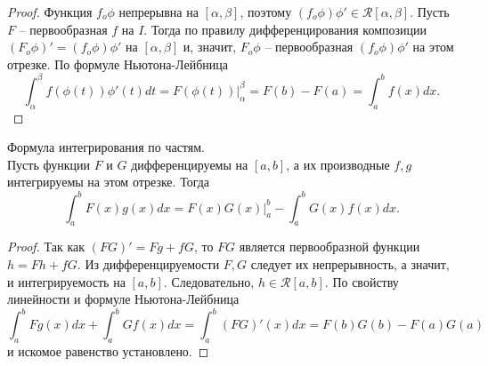     \begin{proof}
        Функция $f_{o}\phi$ непрерывна на $[\alpha, \beta]$, поэтому $(f_{o}\phi)\phi' \in \mathcal{R}[\alpha, \beta]$. Пусть $F$ -- первообразная $f$ на $I$. Тогда по правилу дифференцирования композиции $(F_{o}\phi)' = (f_{o}\phi)\phi'$ на $[\alpha, \beta]$ и, значит, $F_{o}\phi$ -- первообразная $(f_{o}\phi)\phi'$ на этом отрезке. По формуле Ньютона-Лейбница
        \[\int_{\alpha}^{\beta}f(\phi(t))\phi'(t)dt = F(\phi(t))|_{\alpha}^{\beta} = F(b) - F(a) = \int_{a}^{b}f(x)dx.\]
    \end{proof}
    
    \begin{theorem}{Формула интегрирования по частям.}\\
        Пусть функции $F$ и $G$ дифференцируемы на $[a, b]$, а их производные $f, g$ интегрируемы на этом отрезке. Тогда
        \[\int_{a}^{b}F(x)g(x)dx = F(x)G(x)|_{a}^{b} - \int_{a}^{b}G(x)f(x)dx.\]
    \end{theorem}
    
    \begin{proof}
        Так как $(FG)' = Fg + fG$, то $FG$ является первообразной функции $h = Fh + fG$. Из дифференцируемости $F, G$ следует их непрерывность, а значит, и интегрируемость на $[a, b]$. Следовательно, $h \in \mathcal{R}[a, b]$. По свойству линейности и формуле Ньютона-Лейбница
        \[\int_{a}^{b}Fg(x)dx + \int_{a}^{b}Gf(x)dx = \int_{a}^{b}(FG)'(x)dx = F(b)G(b) - F(a)G(a)\]
        и искомое равенство установлено.
    \end{proof}